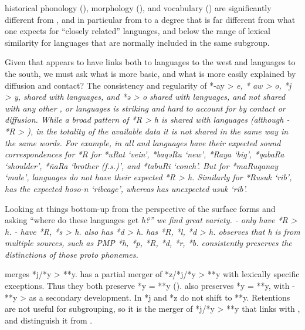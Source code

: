 historical phonology (),
morphology (), and vocabulary () are significantly
different from , and in particular from  to a degree that is far different
from what one expects for “closely related” languages,
and below the range of lexical similarity for languages that
are normally included in the same subgroup.

Given that  appears to have links both to 
languages to the west
and  languages to the south,
we must ask what is more basic,
and what is more easily explained by diffusion
and contact? The consistency
and regularity of *-ay > \it{e},
* aw > \it{o},
*j > \it{y}, shared with  languages,
and *ə > \it{o} shared with  languages,
and not shared with any other ,
 or  languages
is striking and hard to account for by contact or diffusion.
While a broad pattern of *R > \it{h} is shared with 
languages (although - *R > {\0}),
in the totality of the available data it is not shared in the
same way in the same words.
For example, in  all 
and  languages have their expected sound correspondences
for *R for *uRat ‘vein’,
*baqəRu ‘new’, *Raya ‘big’,
*qabaRa ‘shoulder’, *ñaRa ‘brother (f.s.)’, and *tabuRi ‘conch’.
But for *maRuqanay ‘male’,
 languages do not have their expected *R > \it{h}.
Similarly for *Rusuk ‘rib’,
 has the expected \it{hoso-n} ‘ribcage’,
whereas  has unexpected \it{usuk} ‘rib’.

Looking at things bottom-up from the perspective of the surface
forms and asking “where do these languages get \it{h}?” we find great variety.
- only have  *R > \it{h}.
- have *R, *s > \it{h}.
 also has *d > \it{h}.
 has *R, *l, *d > \it{h}.
\citet{Blust1981} observes that  \it{h} is from multiple
sources, such as PMP *h,
*p, *R, *d, *r, *b.
 consistently preserves the distinctions of those proto phonemes.

 merges *j/*y > **y.
 has a partial merger of *z/*j/*y > **y with lexically specific exceptions.
Thus they both preserve *y = **y ().
 also preserves *y = **y,
with - **y > {\0} as a secondary development.
In  *j and *z do not shift to **y.
Retentions are not useful for subgrouping,
so it is the merger of *j/*y > **y that links  with
, and distinguish it from .

